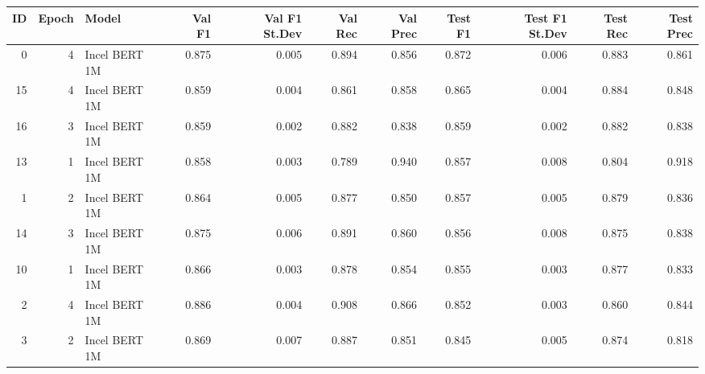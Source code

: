 \begin{tabular}{rrlrrrrrrrr}
\toprule
 ID &  Epoch &         Model &  Val F1 &  Val F1 St.Dev &  Val Rec &  Val Prec &  Test F1 &  Test F1 St.Dev &  Test Rec &  Test Prec \\
\midrule
  0 &      4 & Incel BERT 1M &   0.875 &          0.005 &    0.894 &     0.856 &    0.872 &           0.006 &     0.883 &      0.861 \\
 15 &      4 & Incel BERT 1M &   0.859 &          0.004 &    0.861 &     0.858 &    0.865 &           0.004 &     0.884 &      0.848 \\
 16 &      3 & Incel BERT 1M &   0.859 &          0.002 &    0.882 &     0.838 &    0.859 &           0.002 &     0.882 &      0.838 \\
 13 &      1 & Incel BERT 1M &   0.858 &          0.003 &    0.789 &     0.940 &    0.857 &           0.008 &     0.804 &      0.918 \\
  1 &      2 & Incel BERT 1M &   0.864 &          0.005 &    0.877 &     0.850 &    0.857 &           0.005 &     0.879 &      0.836 \\
 14 &      3 & Incel BERT 1M &   0.875 &          0.006 &    0.891 &     0.860 &    0.856 &           0.008 &     0.875 &      0.838 \\
 10 &      1 & Incel BERT 1M &   0.866 &          0.003 &    0.878 &     0.854 &    0.855 &           0.003 &     0.877 &      0.833 \\
  2 &      4 & Incel BERT 1M &   0.886 &          0.004 &    0.908 &     0.866 &    0.852 &           0.003 &     0.860 &      0.844 \\
  3 &      2 & Incel BERT 1M &   0.869 &          0.007 &    0.887 &     0.851 &    0.845 &           0.005 &     0.874 &      0.818 \\
\hline
\end{tabular}
